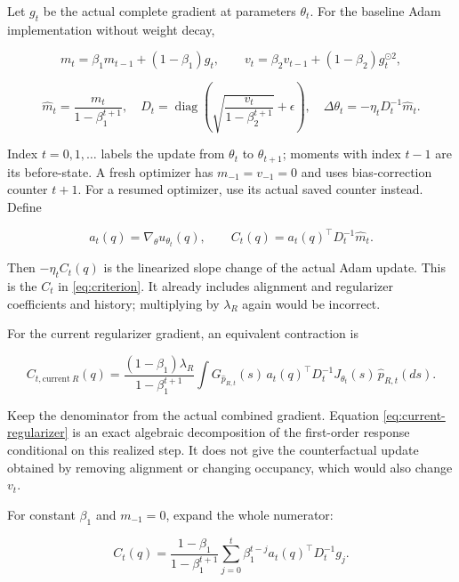 \documentclass[11pt]{article}
\begin{document}
Let \(g_t\) be the actual complete gradient at parameters \(\theta_t\).
For the baseline Adam implementation without weight decay,

\[
m_t=\beta_1m_{t-1}+(1-\beta_1)g_t,\qquad
v_t=\beta_2v_{t-1}+(1-\beta_2)g_t^{\odot2},
\]

\begin{equation}\label{eq:adam}
\widehat m_t=\frac{m_t}{1-\beta_1^{t+1}},\quad
D_t=\operatorname{diag}\left(\sqrt{\frac{v_t}{1-\beta_2^{t+1}}}+\epsilon\right),\quad
\Delta\theta_t=-\eta_tD_t^{-1}\widehat m_t.
\end{equation}

Index \(t=0,1,\ldots\) labels the update from \(\theta_t\) to
\(\theta_{t+1}\); moments with index \(t-1\) are its before-state. A
fresh optimizer has \(m_{-1}=v_{-1}=0\) and uses bias-correction counter
\(t+1\). For a resumed optimizer, use its actual saved counter instead.
Define

\begin{equation}\label{eq:adam-force}
a_t(q)=\nabla_\theta u_{\theta_t}(q),\qquad
C_t(q)=a_t(q)^\top D_t^{-1}\widehat m_t.
\end{equation}

Then \(-\eta_t C_t(q)\) is the linearized slope change of the actual
Adam update. This is the \(C_t\) in \eqref{eq:criterion}. It already includes alignment
and regularizer coefficients and history; multiplying by \(\lambda_R\)
again would be incorrect.

For the current regularizer gradient, an equivalent contraction is

\begin{equation}\label{eq:current-regularizer}
C_{t,\mathrm{current}\ R}(q)=
\frac{(1-\beta_1)\lambda_R}{1-\beta_1^{t+1}}
\int G_{\widehat p_{R,t}}(s)
\,a_t(q)^\top D_t^{-1}J_{\theta_t}(s)\,\widehat p_{R,t}(ds).
\end{equation}

Keep the denominator from the actual combined gradient. Equation \eqref{eq:current-regularizer} is
an exact algebraic decomposition of the first-order response conditional
on this realized step. It does not give the counterfactual update
obtained by removing alignment or changing occupancy, which would also
change \(v_t\).

For constant \(\beta_1\) and \(m_{-1}=0\), expand the whole numerator:

\begin{equation}\label{eq:adam-history}
C_t(q)=\frac{1-\beta_1}{1-\beta_1^{t+1}}
\sum_{j=0}^t\beta_1^{t-j}a_t(q)^\top D_t^{-1}g_j.
\end{equation}
\end{document}
